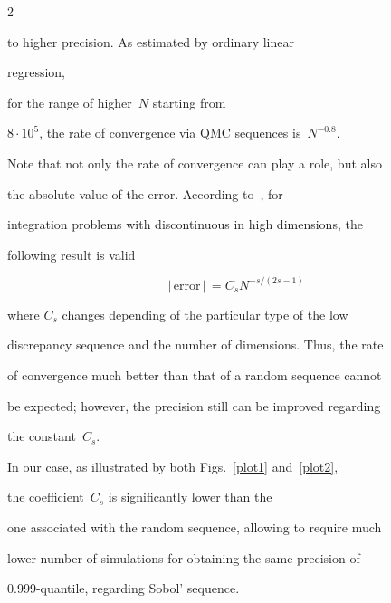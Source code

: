 \begin{multicols}{2}



\noindent

 to higher precision. As estimated by ordinary linear

regression,

 for the range of higher~$N$ starting from

$8\cdot10^5$, the rate of convergence via QMC sequences is~$N^{-0.8}$.




Note that not only the rate of convergence can play a role, but also

the absolute value of the error. According to~\cite{Morok}, for

integration problems with discontinuous in high dimensions, the

following result is valid

\begin{equation}

\label{rate}

\,|\,\mbox{error}\,|\, = C_sN^{-s/(2s-1)}

\end{equation}

where $C_s$ changes depending of the particular type of the low

discrepancy sequence and the number of dimensions. Thus, the rate

of convergence much better than that of a random sequence cannot

be expected; however, the precision still can be improved regarding

the constant~$C_s$.



In our case, as illustrated by both Figs.~\ref{plot1} and~\ref{plot2},

the coefficient~$C_s$ is significantly lower than the

one associated with the random sequence, allowing to require much

lower number of simulations for obtaining the same precision of

0.999-quantile, regarding Sobol' sequence.



\renewcommand{\bibname}{\protect\rmfamily References}

{\small\frenchspacing

{%

}}
\end{multicols}
